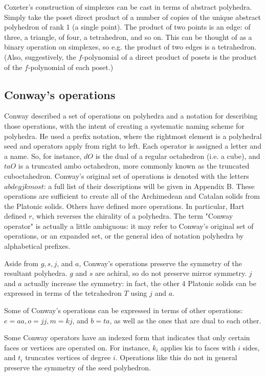\documentclass[12pt]{amsart}%
\begin{document}
Coxeter's construction of simplexes can be cast in terms of abstract polyhedra.
Simply take the poset direct product of a number of copies of the unique
abstract polyhedron of rank 1 (a single point). The product of two points is an
edge: of three, a triangle, of four, a tetrahedron, and so on. This can be
thought of as a binary operation on simplexes, so e.g. the product of two edges
is a tetrahedron. (Also, suggestively, the $f$-polynomial of a direct product
of posets is the product of the $f$-polynomial of each poset.)

\subsection{Conway's operations}
Conway described a set of operations on polyhedra and a notation for describing
those operations, with the intent of creating a systematic naming scheme for
polyhedra.\cite{conway} He used a prefix notation, where the rightmost element
is a polyhedral seed and operators apply from right to left. Each operator is
assigned a letter and a name. So, for instance, $dO$ is the dual of a regular
octahedron (i.e. a cube), and $taO$ is a truncated ambo octahedron, more
commonly known as the truncated cuboctahedron. Conway's original set of
operations is denoted with the letters $abdegjkmost$: a full list of their
descriptions will be given in Appendix B. These operations are sufficient to
create all of the Archimedean and Catalan solids from the Platonic solids.
Others have defined more
operations.\cite{hart98}\cite{hart00}\cite{antiprism}\cite{polyhedronisme} In
particular, Hart \cite{hart98} defined $r$, which reverses the chirality of a
polyhedra. The term "Conway operator" is actually a little ambiguous:
it may refer to Conway's original set of operations, or an expanded set,
or the general idea of notation polyhedra by alphabetical prefixes.

Aside from $g, s, j$, and $a$, Conway's operations preserve the
symmetry of the resultant polyhedra. $g$ and $s$ are achiral, so
do not preserve mirror symmetry. $j$ and $a$ actually increase
the symmetry: in fact, the other 4 Platonic solids can be expressed
in terms of the tetrahedron $T$ using $j$ and $a$.

Some of Conway's operations can be expressed in terms of other operations:
$e=aa, o=jj, m=kj$, and $b=ta$, as well as the ones that are dual to each other.

Some Conway operators have an indexed form that indicates that only certain faces or
vertices are operated on. For instance, $k_i$ applies kis to faces with
$i$ sides, and $t_i$ truncates vertices of degree $i$.
Operations like this do not in general preserve the symmetry of the seed
polyhedron.
\end{document}
